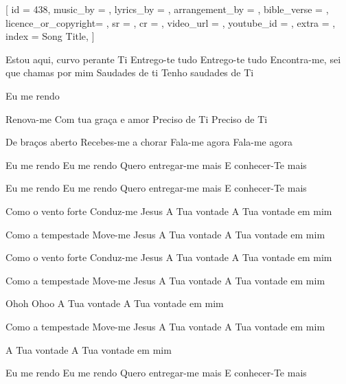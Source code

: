 [
    id                  = {438},
    music_by            = {}, %
    lyrics_by           = {}, %
    arrangement_by      = {}, %
    bible_verse         = {},
    licence_or_copyright= {},
    sr                  = {},
    cr                  = {},
    video_url           = {}, %
    youtube_id          = {}, %
    extra               = {},
    index               = {Song Title},
]

\beginverse
Estou aqui, curvo perante Ti
Entrego-te tudo
Entrego-te tudo
Encontra-me, 
sei que chamas por mim
Saudades de ti
Tenho saudades de Ti

Eu me rendo

Renova-me
Com tua graça e amor
Preciso de Ti
Preciso de Ti

De braços aberto
Recebes-me a chorar
Fala-me agora
Fala-me agora

Eu me rendo
Eu me rendo
Quero entregar-me mais
E conhecer-Te mais

Eu me rendo
Eu me rendo
Quero entregar-me mais
E conhecer-Te mais

Como o vento forte
Conduz-me Jesus
A Tua vontade
A Tua vontade em mim

Como a tempestade
Move-me Jesus
A Tua vontade
A Tua vontade em mim

Como o vento forte
Conduz-me Jesus
A Tua vontade
A Tua vontade em mim

Como a tempestade
Move-me Jesus
A Tua vontade
A Tua vontade em mim

Ohoh
Ohoo
A Tua vontade
A Tua vontade em mim

Como a tempestade
Move-me Jesus
A Tua vontade
A Tua vontade em mim


A Tua vontade
A Tua vontade em mim

Eu me rendo
Eu me rendo
Quero entregar-me mais
E conhecer-Te mais

\endverse

\beginchorus

\endchorus

\beginverse

\endverse

\beginchorus

\endchorus

\beginchorus

\endchorus

\endsong
